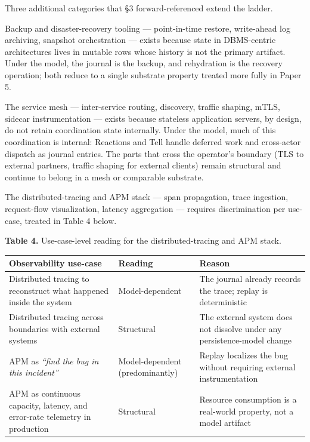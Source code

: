 \documentclass[
]{article}
\newcounter{none} %
\begin{document}
Three additional categories that §3 forward-referenced extend the
ladder.

Backup and disaster-recovery tooling --- point-in-time restore,
write-ahead log archiving, snapshot orchestration --- exists because
state in DBMS-centric architectures lives in mutable rows whose history
is not the primary artifact. Under the model, the journal is the backup,
and rehydration is the recovery operation; both reduce to a single
substrate property treated more fully in Paper 5.

The service mesh --- inter-service routing, discovery, traffic shaping,
mTLS, sidecar instrumentation --- exists because stateless application
servers, by design, do not retain coordination state internally. Under
the model, much of this coordination is internal: Reactions and Tell
handle deferred work and cross-actor dispatch as journal entries. The
parts that cross the operator's boundary (TLS to external partners,
traffic shaping for external clients) remain structural and continue to
belong in a mesh or comparable substrate.

The distributed-tracing and APM stack --- span propagation, trace
ingestion, request-flow visualization, latency aggregation --- requires
discrimination per use-case, treated in Table 4 below.

\textbf{Table 4.} Use-case-level reading for the distributed-tracing and
APM stack.

{\def\LTcaptype{none} %
\begin{longtable}[]{@{}
  >{\raggedright\arraybackslash}p{}
  >{\raggedright\arraybackslash}p{}
  >{\raggedright\arraybackslash}p{}@{}}
\toprule\noalign{}
\begin{minipage}[b]{\linewidth}\raggedright
Observability use-case
\end{minipage} & \begin{minipage}[b]{\linewidth}\raggedright
Reading
\end{minipage} & \begin{minipage}[b]{\linewidth}\raggedright
Reason
\end{minipage} \\
\midrule\noalign{}
\endhead
\bottomrule\noalign{}
\endlastfoot
Distributed tracing to reconstruct what happened inside the system &
Model-dependent & The journal already records the trace; replay is
deterministic \\
Distributed tracing across boundaries with external systems & Structural
& The external system does not dissolve under any persistence-model
change \\
APM as \emph{``find the bug in this incident''} & Model-dependent
(predominantly) & Replay localizes the bug without requiring external
instrumentation \\
APM as continuous capacity, latency, and error-rate telemetry in
production & Structural & Resource consumption is a real-world property,
not a model artifact \\
\end{longtable}
}
\end{document}
